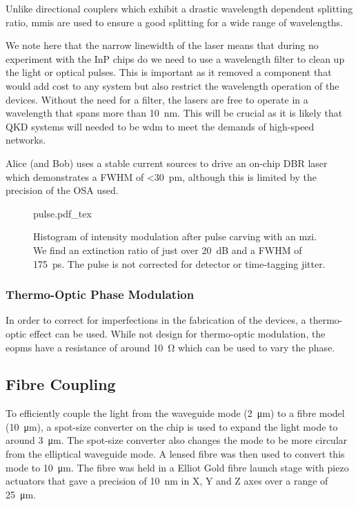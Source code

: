 Unlike directional couplers which exhibit a drastic wavelength dependent splitting ratio, \acp{mmi} are used to ensure a good splitting for a wide range of wavelengths. 

We note here that the narrow linewidth of the laser means that during no experiment with the \ac{InP} chips do we need to use a wavelength filter to clean up the light or optical pulses. This is important as it removed a component that would add cost to any system but also restrict the wavelength operation of the devices. Without the need for a filter, the lasers are free to operate in a wavelength that spans more than \SI{10}{nm}. This will be crucial as it is likely that \ac{QKD} systems will needed to be \ac{wdm} to meet the demands of high-speed networks.

Alice (and Bob) uses a stable current sources to drive an on-chip \ac{DBR} laser which demonstrates a \ac{FWHM} of \SI{<30}{pm}, although this is limited by the precision of the \ac{OSA} used.

\begin{figure}[tbp]
	\centering
	\def\svgwidth{\textwidth} 
	{pulse.pdf_tex}
	\caption[On-chip intensity modulation of coherent states]{Histogram of intensity modulation after pulse carving with an \ac{mzi}. We find an extinction ratio of just over \SI{20}{dB} and a \ac{FWHM} of \SI{175}{\ps}. The pulse is not corrected for detector or time-tagging jitter.}
	\label{fig:pulses}
\end{figure}

\subsubsection{Thermo-Optic Phase Modulation}

In order to correct for imperfections in the fabrication of the devices, a thermo-optic effect can be used. While not design for thermo-optic modulation, the \acp{eopm} have a resistance of around \SI{10}{\ohm} which can be used to vary the phase.

\subsection{Fibre Coupling}

To efficiently couple the light from the waveguide mode (\SI{2}{\micro\metre}) to a fibre model (\SI{10}{\micro\metre}), a spot-size converter on the chip is used to expand the light mode to around \SI{3}{\micro\meter}. The spot-size converter also changes the mode to be more circular from the elliptical waveguide mode. A lensed fibre was then used to convert this mode to \SI{10}{\micro\meter}. The fibre was held in a Elliot Gold fibre launch stage with piezo actuators that gave a precision of \SI{10}{\nm} in X, Y and Z axes over a range of \SI{25}{\micro\meter}.

